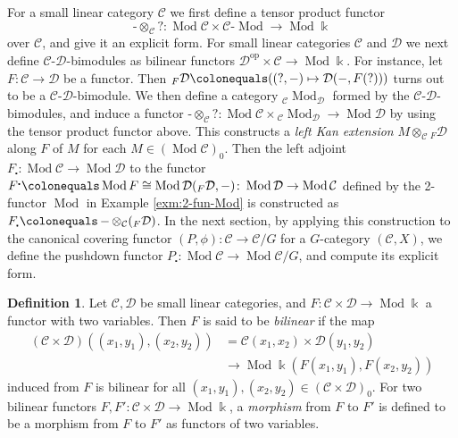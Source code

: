 \documentclass{surv-l}
\numberwithin{equation}{chapter}
\numberwithin{figure}{chapter}
\theoremstyle{plain}
\theoremstyle{definition}
\newtheorem{dfn}[thm]{Definition}
\theoremstyle{remark}
\newcommand{\bMod}[2]{{}_{#1}\!\Mod_{#2}}
\DeclareMathOperator{\Mod}{Mod}
\DeclareMathOperator{\blank}{-}
\begin{document}
For a small linear category ${\mathcal{C}}$ we first define a tensor product functor
\[
\blank \otimes_{\mathcal{C}} ?  \colon \Mod {\mathcal{C}} \times {\mathcal{C}}\text{-}\Mod \to \Mod \Bbbk
\]
over ${\mathcal{C}}$, and give it an explicit form.
For small linear categories ${\mathcal{C}}$ and ${\mathcal{D}}$ we next define ${\mathcal{C}}$-${\mathcal{D}}$-bimodules
as bilinear functors ${\mathcal{D}}^{\mathrm{op}} \times {\mathcal{C}} \to \Mod \Bbbk$.
For instance, let $F \colon {\mathcal{C}} \to {\mathcal{D}}$ be a functor.
Then ${}_F{\mathcal{D}}\colonequals ((?, \blank) \mapsto {\mathcal{D}}(\blank, F(?)))$
turns out to be a ${\mathcal{C}}$-${\mathcal{D}}$-bimodule.
We then define a category $\bMod{\mathcal{C}}{\mathcal{D}}$ formed by the ${\mathcal{C}}$-${\mathcal{D}}$-bimodules,
and induce a functor
$\blank \otimes_{\mathcal{C}} ?  \colon \Mod {\mathcal{C}} \times \bMod{\mathcal{C}}{\mathcal{D}} \to \Mod {\mathcal{D}}$
by using the tensor product functor above.
This constructs a \emph{left Kan extension} $M \otimes_{\mathcal{C}} {}_F{\mathcal{D}}$
along $F$ of $M$ for each $M \in (\Mod {\mathcal{C}})_0$.
Then the left adjoint $F_{\centerdot} \colon \Mod {\mathcal{C}} \to \Mod{\mathcal{D}}$
to the functor $F^{\centerdot}\colonequals   \Mod F \cong \Mod {\mathcal{D}}({}_F{\mathcal{D}}, \blank) \colon \Mod {\mathcal{D}} \to \Mod{\mathcal{C}}$
defined by the 2-functor $\Mod$ in Example \ref{exm:2-fun-Mod}
is constructed as $F_{\centerdot}\colonequals  \blank \otimes_{\mathcal{C}} ({}_F{\mathcal{D}})$.
In the next section, by applying this construction
to the canonical covering functor $(P, \phi) \colon {\mathcal{C}} \to {\mathcal{C}}/G$
for a $G$-category $({\mathcal{C}}, X)$,
we define the pushdown functor
$P_{\centerdot} \colon \Mod {\mathcal{C}} \to \Mod {\mathcal{C}}/G$,
and compute its explicit form.

\begin{dfn}
Let ${\mathcal{C}}, {\mathcal{D}}$ be small linear categories, and
$F \colon {\mathcal{C}} \times {\mathcal{D}} \to \Mod \Bbbk$ a functor with two variables.
Then $F$ is said to be \emph{bilinear} if
the map
\[
\begin{aligned}
({\mathcal{C}} \times {\mathcal{D}})((x_1, y_1), (x_2, y_2)) &= {\mathcal{C}}(x_1, x_2) \times {\mathcal{D}}(y_1, y_2)\\
 &\to \Mod \Bbbk (F(x_1, y_1), F(x_2, y_2))
\end{aligned}
\]
induced from $F$ is bilinear
for all $(x_1, y_1), (x_2, y_2) \in ({\mathcal{C}} \times {\mathcal{D}})_0$.
For two bilinear functors $F, F' \colon {\mathcal{C}} \times {\mathcal{D}} \to \Mod \Bbbk$,
a \emph{morphism} from $F$ to $F'$ is defined to be
a morphism from $F$ to $F'$ as functors of two variables.
\end{dfn}
\end{document}
